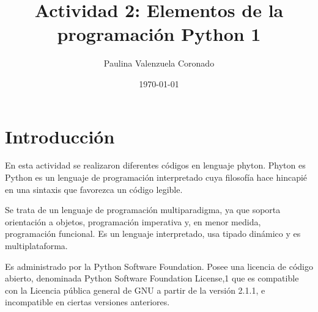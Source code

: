 \documentclass[a4paper]{article}
\title{Actividad 2: Elementos de la programación Python 1}
\author{Paulina Valenzuela Coronado}
\date{\today}
\begin{document}
\maketitle

\section{Introducción}
En esta actividad se realizaron diferentes códigos en lenguaje phyton.
Phyton es Python es un lenguaje de programación interpretado cuya filosofía hace hincapié en una sintaxis que favorezca un código legible.

Se trata de un lenguaje de programación multiparadigma, ya que soporta orientación a objetos, programación imperativa y, en menor medida, programación funcional. Es un lenguaje interpretado, usa tipado dinámico y es multiplataforma.

Es administrado por la Python Software Foundation. Posee una licencia de código abierto, denominada Python Software Foundation License,1 que es compatible con la Licencia pública general de GNU a partir de la versión 2.1.1, e incompatible en ciertas versiones anteriores.
\end{document}
